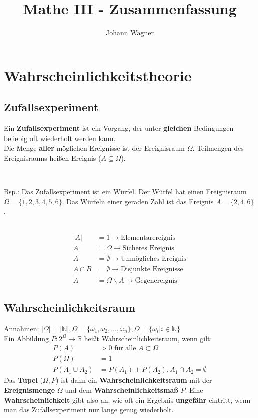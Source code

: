\documentclass[a4paper]{article}
\author{Johann Wagner}
\title{Mathe III - Zusammenfassung}
\newenvironment{exEnv}{\ \\\begin{addmargin}[4em]{4em}\begin{em}}{\end{em}\end{addmargin}\ }
\begin{document}
\maketitle
\newpage

\section{Wahrscheinlichkeitstheorie}
	\subsection{Zufallsexperiment}
	Ein \textbf{Zufallsexperiment} ist ein Vorgang, der unter \textbf{gleichen} Bedingungen beliebig oft wiederholt werden kann.\\
	Die Menge \textbf{aller} möglichen Ereignisse ist der Ereignisraum $\Omega$. Teilmengen des Ereignisraums heißen Ereignis ($A \subseteq \Omega$).
	
	\begin{exEnv}
	Bsp.: Das Zufallsexperiment ist ein Würfel. Der Würfel hat einen Ereignisraum $\Omega = \{1,2,3,4,5,6\}$. Das Würfeln einer geraden Zahl ist das Ereignis $A = \{2,4,6\}$.
	\end{exEnv}
	\begin{align*}
		|A| &= 1 \rightarrow \text{Elementarereignis}\\
		 A &= \Omega \rightarrow \text{Sicheres Ereignis}\\
		 A &= \emptyset \rightarrow \text{Unmögliches Ereignis}\\
		 A \cap B &= \emptyset \rightarrow \text{Disjunkte Ereignisse}\\
		 \bar{A} &= \Omega \backslash A \rightarrow \text{Gegenereignis}
	\end{align*}
	
	\subsection{Wahrscheinlichkeitsraum}
	Annahmen: $|\Omega| = |\mathbb{N}|, \Omega = \{\omega_1,\omega_2, ..., \omega_n \}, \Omega = \{\omega_i | i \in \mathbb{N}\}$\\
	Ein Abbildung $P: 2^\Omega \rightarrow \mathbb{R}$ heißt Wahrscheinlichkeitsraum, wenn gilt:
	\begin{align}
		P(A) &> 0 \text{ für alle } A \subset \Omega\\
		P(\Omega) &= 1\\
		P(A_1 \cup A_2) &= P(A_1) + P(A_2), A_1 \cap A_2 = \emptyset
	\end{align}
	Das \textbf{Tupel} ($\Omega, P$) ist dann ein \textbf{Wahrscheinlichkeitsraum} mit der \textbf{Ereignismenge} $\Omega$ und dem \textbf{Wahrscheinlichkeitsmaß} $P$. Eine \textbf{Wahrscheinlichkeit} gibt also an, wie oft ein Ergebnis \textbf{ungefähr} eintritt, wenn man das Zufallsexperiment nur lange genug wiederholt.
	
\end{document}
